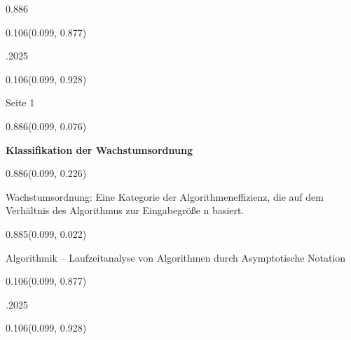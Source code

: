 \documentclass[aspectratio=169]{beamer}
\begin{document}
\begin{frame}[fragile]
\begin{textblock}{0.886}
\end{textblock}
\begin{textblock}{0.106}(0.099, 0.877)
  \begin{minipage}[b][0.026\paperheight]{\linewidth}
    \raggedright
    \fontsize{3}{3.3}.2025
  \end{minipage}
\end{textblock}
\begin{textblock}{0.106}(0.099, 0.928)
  \begin{minipage}[b][0.031\paperheight]{\linewidth}
    \raggedright
    \fontsize{3}{3.3}\selectfont
    Seite 1
  \end{minipage}
\end{textblock}
\end{frame}

\begin{frame}[fragile]
\begin{textblock}{0.886}(0.099, 0.076)
  \begin{minipage}[t][0.131\paperheight]{\linewidth}
    \textbf{Klassifikation der Wachstumsordnung}
  \end{minipage}
\end{textblock}
\begin{textblock}{0.886}(0.099, 0.226)
  \begin{minipage}[t][0.63\paperheight]{\linewidth}
    {\small
    Wachstumsordnung: Eine Kategorie der Algorithmeneffizienz, die auf dem Verhältnis des Algorithmus zur Eingabegröße n basiert.
    }
  \end{minipage}
\end{textblock}
\begin{textblock}{0.885}(0.099, 0.022)
  \begin{minipage}[b][0.031\paperheight]{\linewidth}
    \fontsize{3}{3.3}\selectfont
    Algorithmik – Laufzeitanalyse von Algorithmen durch Asymptotische Notation
  \end{minipage}
\end{textblock}
\begin{textblock}{0.106}(0.099, 0.877)
  \begin{minipage}[b][0.026\paperheight]{\linewidth}
    \raggedright
    \fontsize{3}{3.3}.2025
  \end{minipage}
\end{textblock}
\begin{textblock}{0.106}(0.099, 0.928)
  \begin{minipage}[b][0.031\paperheight]{\linewidth}

\end{minipage}
\end{textblock}
\end{frame}
\end{document}
